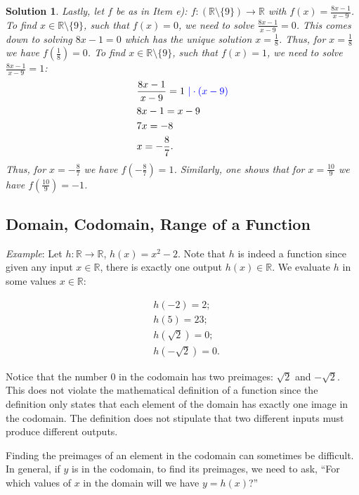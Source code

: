 \documentclass[12pt]{article}
\newtheorem{sol}[prop]{Solution}
\begin{document}
\begin{sol}
Lastly, let $f$ be as in Item e): $f:(\mathbb{R}\setminus\{9\})\to\mathbb{R}$ with $f(x)=\frac{8x-1}{x-9}$. To find $x\in \mathbb{R}\setminus\{9\}$, such that $f(x)=0$, we need to solve $\frac{8x-1}{x-9}=0$. This comes down to solving $8x-1=0$ which has the unique solution $x=\frac{1}{8}$. Thus, for $x=\frac{1}{8}$ we have $f(\frac{1}{8})=0$. To find $x\in \mathbb{R}\setminus\{9\}$, such that $f(x)=1$, we need to solve $\frac{8x-1}{x-9}=1$:
\begin{equation*}
\begin{split}
&\frac{8x-1}{x-9}=1\textcolor{blue}{\ | \cdot (x-9)}\\
& 8x-1=x-9\\
& 7x=-8\\
& x=-\frac{8}{7}.
\end{split}
\end{equation*}
Thus, for $x=-\frac{8}{7}$ we have $f(-\frac{8}{7})=1$. Similarly, one shows that for $x=\frac{10}{9}$ we have $f(\frac{10}{9})=-1$.
\end{sol}

\subsection{Domain, Codomain, Range of a Function}

\textit{Example}: Let $h:\mathbb{R}\to \mathbb{R}$, $h(x)=x^{2}-2$. Note that $h$ is indeed a function since given any input $x\in \mathbb{R}$, there is exactly one output $h(x)\in \mathbb{R}$. We evaluate $h$ in some values $x\in \mathbb{R}$:
\begin{center}
\begin{equation*}
\begin{split}
& h(-2)=2;\\
& h(5)=23;\\
& h(\sqrt{2})=0;\\
& h(-\sqrt{2})=0.
\end{split}
\end{equation*}
\end{center}
Notice that the number $0$ in the codomain has two preimages: $\sqrt{2}$ and $-\sqrt{2}$. This does not violate the mathematical definition of a function since the definition only states that each element of the domain has exactly one image in the codomain. The definition does not stipulate that two different inputs must produce different outputs.

Finding the preimages of an element in the codomain can sometimes be difficult. In general, if $y$ is in the codomain, to find its preimages, we need to ask, “For which values of $x$ in the domain will we have $y=h(x)$?” 
\end{document}
